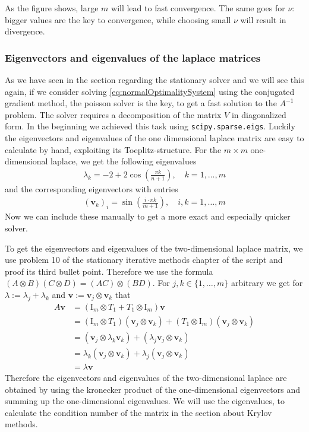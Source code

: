 \documentclass{amsart}
\theoremstyle{definition}
\theoremstyle{remark}
\numberwithin{equation}{section}
\renewcommand{\vec}{\textbf}
\begin{document}
As the figure shows, large $m$ will lead to fast convergence. The same goes for $\nu$: bigger values are the key to convergence, while choosing small $\nu$ will result in divergence.


\subsubsection{Eigenvectors and eigenvalues of the laplace matrices}
As we have seen in the section regarding the stationary solver and we will see this again, if we consider solving \eqref{eq:normalOptimalitySystem} 
using the conjugated gradient method, the poisson solver is the key, to get a fast solution to the $A^{-1}$ problem. The solver requires a decomposition
of the matrix $V$ in diagonalized form. In the beginning we achieved this task using \texttt{scipy.sparse.eigs}. Luckily the eigenvectors and eigenvalues
of the one dimensional laplace matrix are easy to calculate by hand, exploiting its Toeplitz-structure. For the $m\times m$ one-dimensional laplace, we 
get the following eigenvalues
\begin{align*}
\lambda_k = -2 + 2 \cos \left( \frac{\pi k}{n+1} \right), \quad k=1,\ldots, m
\end{align*} 
and the corresponding eigenvectors with entries
\begin{align*}
(\vec{v}_k)_i = \sin\left(\frac{i\cdot \pi k}{m+1} \right), \quad i,k=1,\ldots,m
\end{align*}
Now we can include these manually to get a more exact and especially quicker solver.

To get the eigenvectors and eigenvalues of the two-dimensional laplace matrix, we use problem 10 of the 
stationary iterative methods chapter of the script and proof its third bullet 
point. Therefore we use the formula $(A \otimes B)(C \otimes D) = (AC) \otimes (BD)$. For $j,k \in \{1, \ldots, m\}$ arbitrary we get for $\lambda := 
\lambda_j + \lambda_k$ and $\vec{v} := \vec{v}_j \otimes \vec{v}_k$ that
\begin{align*}
A\vec{v} &= \left(\text{I}_m \otimes T_1 + T_1 \otimes \text{I}_m \right) \vec{v}\\
&= \left( \text{I}_m \otimes T_1\right)\left(\vec{v}_j \otimes \vec{v}_k\right) + \left( T_1 \otimes \text{I}_m\right)\left(\vec{v}_j \otimes \vec{v}_k\right)\\
&= \left( \vec{v}_j \otimes \lambda_k \vec{v}_k\right) + \left( \lambda_j\vec{v}_j \otimes  \vec{v}_k\right)\\
&= \lambda_k\left( \vec{v}_j \otimes  \vec{v}_k\right) + \lambda_j\left( \vec{v}_j \otimes  \vec{v}_k\right)\\
&= \lambda \vec{v}
\end{align*}
Therefore the eigenvectors and eigenvalues of the two-dimensional laplace are obtained by using the kronecker product of the one-dimensional eigenvectors
and summing up the one-dimensional eigenvalues. We will use the eigenvalues, to calculate the condition number of the matrix in the section
about Krylov methods.
\end{document}

